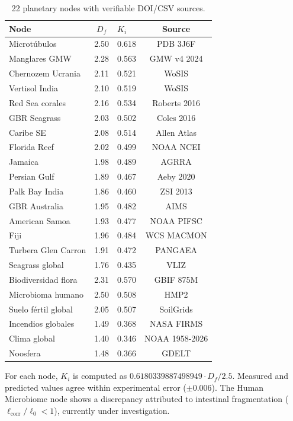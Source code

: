 \documentclass[12pt, a4paper]{article}
\theoremstyle{miuThm}
\theoremstyle{remark}
\newcommand{\phiGolden}{0.6180339887498949}
\begin{document}
\begin{table}[h!]
\centering
\caption{22 planetary nodes with verifiable DOI/CSV sources.}
\label{tab:ref_rapida_2}
\begin{tabular}{lclc}
\toprule
\textbf{Node} & \textbf{$D_f$} & \textbf{$K_i$} & \textbf{Source} \\
\midrule
Microtúbulos & 2.50 & 0.618 & PDB 3J6F \\
Manglares GMW & 2.28 & 0.563 & GMW v4 2024 \\
Chernozem Ucrania & 2.11 & 0.521 & WoSIS \\
Vertisol India & 2.10 & 0.519 & WoSIS \\
Red Sea corales & 2.16 & 0.534 & Roberts 2016 \\
GBR Seagrass & 2.03 & 0.502 & Coles 2016 \\
Caribe SE & 2.08 & 0.514 & Allen Atlas \\
Florida Reef & 2.02 & 0.499 & NOAA NCEI \\
Jamaica & 1.98 & 0.489 & AGRRA \\
Persian Gulf & 1.89 & 0.467 & Aeby 2020 \\
Palk Bay India & 1.86 & 0.460 & ZSI 2013 \\
GBR Australia & 1.95 & 0.482 & AIMS \\
American Samoa & 1.93 & 0.477 & NOAA PIFSC \\
Fiji & 1.96 & 0.484 & WCS MACMON \\
Turbera Glen Carron & 1.91 & 0.472 & PANGAEA \\
Seagrass global & 1.76 & 0.435 & VLIZ \\
Biodiversidad flora & 2.31 & 0.570 & GBIF 875M \\
Microbioma humano & 2.50 & 0.508 & HMP2 \\
Suelo fértil global & 2.05 & 0.507 & SoilGrids \\
Incendios globales & 1.49 & 0.368 & NASA FIRMS \\
Clima global & 1.40 & 0.346 & NOAA 1958-2026 \\
Noosfera & 1.48 & 0.366 & GDELT \\
\bottomrule
\end{tabular}
\end{table}

For each node, $K_i$ is computed as $\phiGolden \cdot D_f / 2.5$. Measured and predicted values agree within experimental error ($\pm 0.006$). The Human Microbiome node shows a discrepancy attributed to intestinal fragmentation ($\ell_{\text{corr}}/\ell_0 < 1$), currently under investigation.
\end{document}
